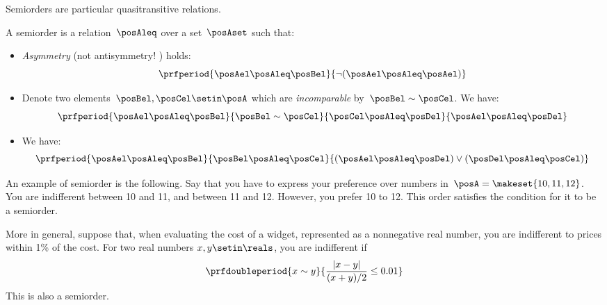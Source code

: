 Semiorders are particular quasitransitive relations.
\begin{definition}[Semiorder]

    A semiorder is a relation~$\posAleq$ over a set~$\posAset$ such that:
    \begin{itemize}
        \item \emph{Asymmetry} (not antisymmetry!
              ) holds:
              \begin{equation}
                  \prfperiod{\posAel \posAleq \posBel}{\neg(\posAel \posAleq \posAel)}
              \end{equation}
        \item Denote two elements~$\posBel, \posCel \setin \posA$ which are \emph{incomparable} by~$\posBel \sim \posCel$.
              We have:
              \begin{equation}
                  \prfperiod{\posAel \posAleq \posBel}{\posBel \sim \posCel}{\posCel \posAleq \posDel}{\posAel \posAleq \posDel}
              \end{equation}
        \item We have:
              \begin{equation}
                  \prfperiod{\posAel \posAleq \posBel}{\posBel \posAleq \posCel}{(\posAel \posAleq \posDel) \vee (\posDel \posAleq \posCel)}
              \end{equation}
    \end{itemize}

\end{definition}
\begin{example}
    An example of semiorder is the following.
    Say that you have to express your preference over numbers in~$\posA=\makeset{10,11,12}$.
    You are indifferent between 10 and 11, and between 11 and 12.
    However, you prefer 10 to 12.
    This order satisfies the condition for it to be a semiorder.

    More in general, suppose that, when evaluating the cost of a widget, represented as a nonnegative real number, you are indifferent to prices within 1\% of the cost.
    For two real numbers $x,y\setin\reals$, you are indifferent if
    \begin{equation}
        \prfdoubleperiod{
            x \sim y
        }{
            \frac{| x - y |}{ (x+y)/2} \leq 0.01
        }
    \end{equation}
    This is also a semiorder.
\end{example}

